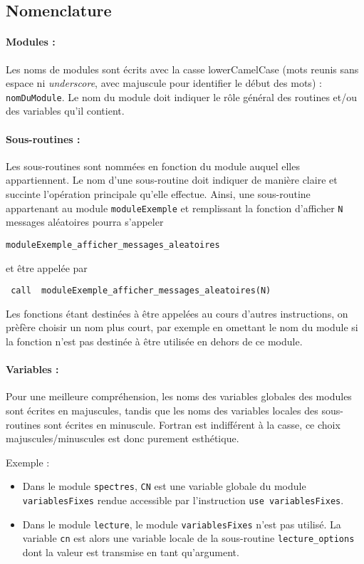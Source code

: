 \subsection{Nomenclature}
\paragraph{Modules :}
Les noms de modules sont écrits avec la casse lowerCamelCase (mots reunis sans espace ni {\it underscore}, avec majuscule pour identifier le début des mots) : \lstinline{nomDuModule}.
Le nom du module doit indiquer le r\^ole général des routines et/ou des variables qu'il contient.

\paragraph{Sous-routines :} 
Les sous-routines sont nommées en fonction du module auquel elles appartiennent.
Le nom d'une sous-routine doit indiquer de manière claire et succinte l'opération principale qu'elle effectue.
Ainsi, une sous-routine appartenant au module \lstinline{moduleExemple} et remplissant la fonction d'afficher \lstinline{N} messages aléatoires pourra s'appeler 

\lstinline{moduleExemple_afficher_messages_aleatoires}

 et être appelée par
 
 \lstinline{ call  moduleExemple_afficher_messages_aleatoires(N)}

Les fonctions étant destinées à être appelées au cours d'autres instructions, on prèfère choisir un nom plus court, par exemple en omettant le nom du module si la fonction n'est pas destinée à être utilisée en dehors de ce module.

\paragraph{Variables :}
Pour une meilleure compréhension, les noms des variables globales des modules sont écrites en majuscules, tandis que les noms des variables locales des sous-routines sont écrites en minuscule.
Fortran est indifférent à la casse, ce choix majuscules/minuscules est donc purement esthétique.

Exemple : 
\begin{itemize}
\item Dans le module \lstinline{spectres}, \lstinline{CN} est une variable globale du module \lstinline{variablesFixes} rendue accessible par l'instruction \lstinline{use variablesFixes}.
\item Dans le module \lstinline{lecture}, le module \lstinline{variablesFixes} n'est pas utilisé.
 La variable \lstinline{cn} est alors une variable locale de la sous-routine \lstinline{lecture_options}  dont la valeur est transmise en tant qu'argument. 
\end{itemize}

